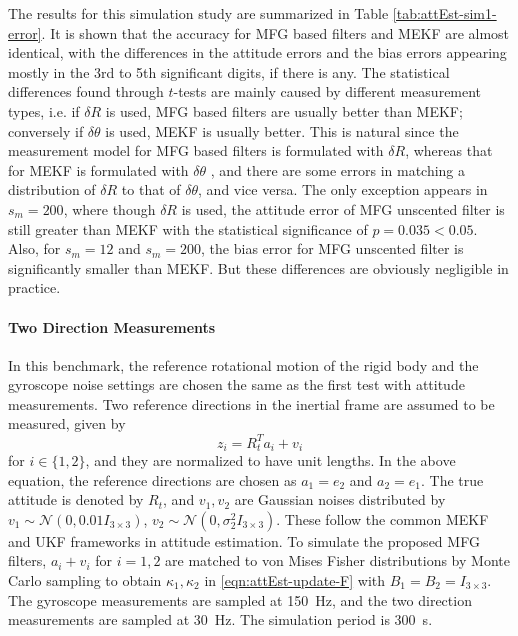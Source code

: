 The results for this simulation study are summarized in Table \ref{tab:attEst-sim1-error}.
It is shown that the accuracy for MFG based filters and MEKF are almost identical, with the differences in the attitude errors and the bias errors appearing mostly in the 3rd to 5th significant digits, if there is any.
The statistical differences found through $t$-tests are mainly caused by different measurement types, i.e. if $\delta R$ is used, MFG based filters are usually better than MEKF; conversely if $\delta\theta$ is used, MEKF is usually better.
This is natural since the measurement model for MFG based filters is formulated with $\delta R$, whereas that for MEKF is formulated with $\delta\theta$ \cite{lefferts1982kalman}, and there are some errors in matching a distribution of $\delta R$ to that of $\delta\theta$, and vice versa.
The only exception appears in $s_m=200$, where though $\delta R$ is used, the attitude error of MFG unscented filter is still greater than MEKF with the statistical significance of $p=0.035<0.05$.
Also, for $s_m=12$ and $s_m=200$, the bias error for MFG unscented filter is significantly smaller than MEKF.
But these differences are obviously negligible in practice.

\paragraph{Two Direction Measurements}

In this benchmark, the reference rotational motion of the rigid body and the gyroscope noise settings are chosen the same as the first test with attitude measurements.
Two reference directions in the inertial frame are assumed to be measured, given by
\begin{equation}
	z_{i} = R_t^T a_{i} + v_{i}
\end{equation}
for $i\in\{1,2\}$, and they are normalized to have unit lengths.
In the above equation, the reference directions are chosen as $a_1=e_2$ and $a_2=e_1$.
The true attitude is denoted by $R_t$, and $v_1,v_2$ are Gaussian noises distributed by $v_1 \sim \mathcal{N}(0,0.01I_{3\times3})$, $v_2 \sim \mathcal{N}(0,\sigma_2^2I_{3\times3})$. 
These follow the common MEKF and UKF frameworks in attitude estimation.
To simulate the proposed MFG filters, $a_i+v_i$ for $i=1,2$ are matched to von Mises Fisher distributions by Monte Carlo sampling to obtain $\kappa_1,\kappa_2$ in \eqref{eqn:attEst-update-F} with $B_1 = B_2 = I_{3\times 3}$.
The gyroscope measurements are sampled at \SI{150}{\hertz}, and the two direction measurements are sampled at \SI{30}{\hertz}.
The simulation period is \SI{300}{\second}.

